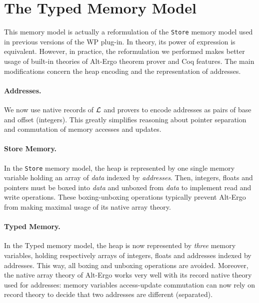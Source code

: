 
\section{The Typed Memory Model}

This memory model is actually a reformulation of the \texttt{Store}
memory model used in previous versions of the \textsf{WP} plug-in. In
theory, its power of expression is equivalent. However, in practice,
the reformulation we performed makes better usage of built-in theories
of \textsf{Alt-Ergo} theorem prover and \textsf{Coq} features.
The main modifications concern the heap encoding and the
representation of addresses.

\paragraph{Addresses.} We now use native records of $\cal{L}$ and provers 
to encode addresses as pairs of base and offset (integers). This
greatly simplifies reasoning about pointer separation and commutation of
memory accesses and updates.

\paragraph{Store Memory.} In the \texttt{Store} memory model, the heap is 
represented by one single memory variable holding an array of
\emph{data} indexed by \emph{addresses}. Then, integers, floats and
pointers must be boxed into \emph{data} and unboxed from \emph{data}
to implement read and write operations. These boxing-unboxing
operations typically prevent \textsf{Alt-Ergo} from making maximal usage
of its native array theory.

\paragraph{Typed Memory.} In the \textsf{Typed} memory model, the heap is 
now represented by \emph{three} memory variables, holding respectively
arrays of integers, floats and addresses indexed by addresses. This
way, all boxing and unboxing operations are avoided. Moreover, the
native array theory of \textsf{Alt-Ergo} works very well with its
record native theory used for addresses: memory variables
access-update commutation can now rely on record theory to decide that
two addresses are different (separated).
